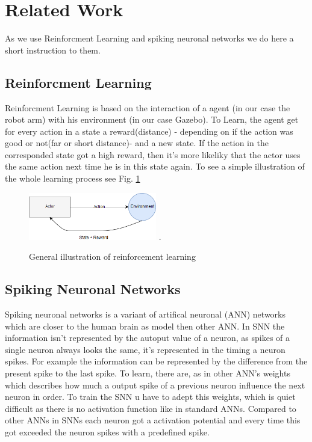 \section{Related Work}%
As we use Reinforcment Learning and spiking neuronal networks we do here a short instruction to them.
\subsection{Reinforcment Learning}%
Reinforcment Learning is based on the interaction of a agent (in our case the robot arm) with his environment (in our case Gazebo). To Learn, the agent get for every action in a state a reward(distance) - depending on if the action was good or not(far or short distance)- and a new state. If the action in the corresponded state got a high reward, then it's more likeliky that the actor uses the same action next time he is in this state again. To see a simple illustration of the whole learning process see Fig. \ref{re_base}
\begin{figure}[H]
	\centering
	\includegraphics[width=2.2in]{img/re_base.png}
	\DeclareGraphicsExtensions.
	\caption{General illustration of reinforcement learning}
	\label{re_base}
\end{figure}

\subsection{Spiking Neuronal Networks}%
Spiking neuronal networks is a variant of artifical neuronal (ANN) networks which are closer to the human brain as model then other ANN. In SNN the information isn't represented by the autoput value of a neuron, as spikes of a single neuron always looks the same, it's represented in the timing a neuron spikes. For example the information can be represented by the difference from the present spike to the last spike. To learn, there are, as in other ANN's weights which describes how much a output spike of a previous neuron influence the next neuron in order. To train the SNN u have to adept this weights, which is quiet difficult as there is no activation function like in standard ANNs. Compared to other ANNs in SNNs each neuron got a activation potential and every time this got exceeded the neuron spikes with a predefined spike.

